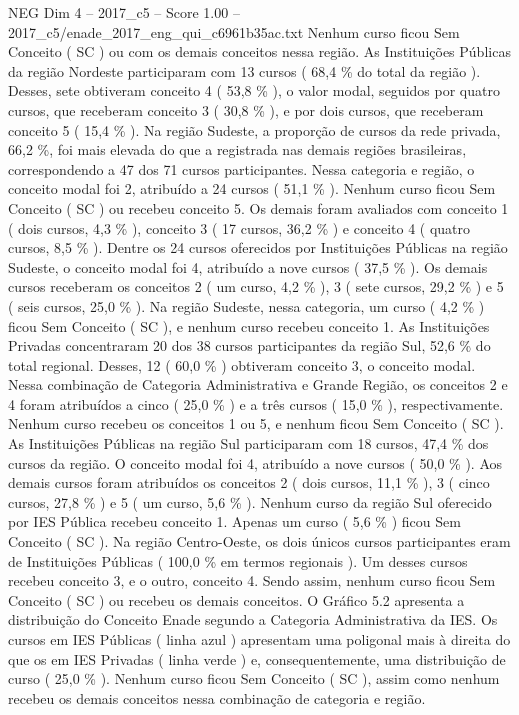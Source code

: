 \begin{textsample}{NEG Dim 4 – 2017\_c5 – Score 1.00 – 2017\_c5/enade\_2017\_eng\_qui\_c6961b35ac.txt}
Nenhum curso ficou Sem Conceito ( SC ) ou com os demais conceitos nessa região.
As Instituições Públicas da região Nordeste participaram com 13 cursos ( 68,4 \% do total da região ).
Desses, sete obtiveram conceito 4 ( 53,8 \% ), o valor modal, seguidos por quatro cursos, que receberam conceito 3 ( 30,8 \% ), e por dois cursos, que receberam conceito 5 ( 15,4 \% ).
Na região Sudeste, a proporção de cursos da rede privada, 66,2 \%, foi mais elevada do que a registrada nas demais regiões brasileiras, correspondendo a 47 dos 71 cursos participantes.
Nessa categoria e região, o conceito modal foi 2, atribuído a 24 cursos ( 51,1 \% ).
Nenhum curso ficou Sem Conceito ( SC ) ou recebeu conceito 5.
Os demais foram avaliados com conceito 1 ( dois cursos, 4,3 \% ), conceito 3 ( 17 cursos, 36,2 \% ) e conceito 4 ( quatro cursos, 8,5 \% ).
Dentre os 24 cursos oferecidos por Instituições Públicas na região Sudeste, o conceito modal foi 4, atribuído a nove cursos ( 37,5 \% ).
Os demais cursos receberam os conceitos 2 ( um curso, 4,2 \% ), 3 ( sete cursos, 29,2 \% ) e 5 ( seis cursos, 25,0 \% ).
Na região Sudeste, nessa categoria, um curso ( 4,2 \% ) ficou Sem Conceito ( SC ), e nenhum curso recebeu conceito 1.
As Instituições Privadas concentraram 20 dos 38 cursos participantes da região Sul, 52,6 \% do total regional.
Desses, 12 ( 60,0 \% ) obtiveram conceito 3, o conceito modal.
Nessa combinação de Categoria Administrativa e Grande Região, os conceitos 2 e 4 foram atribuídos a cinco ( 25,0 \% ) e a três cursos ( 15,0 \% ), respectivamente.
Nenhum curso recebeu os conceitos 1 ou 5, e nenhum ficou Sem Conceito ( SC ).
As Instituições Públicas na região Sul participaram com 18 cursos, 47,4 \% dos cursos da região.
O conceito modal foi 4, atribuído a nove cursos ( 50,0 \% ).
Aos demais cursos foram atribuídos os conceitos 2 ( dois cursos, 11,1 \% ), 3 ( cinco cursos, 27,8 \% ) e 5 ( um curso, 5,6 \% ).
Nenhum curso da região Sul oferecido por IES Pública recebeu conceito 1.
Apenas um curso ( 5,6 \% ) ficou Sem Conceito ( SC ).
Na região Centro-Oeste, os dois únicos cursos participantes eram de Instituições Públicas ( 100,0 \% em termos regionais ).
Um desses cursos recebeu conceito 3, e o outro, conceito 4.
Sendo assim, nenhum curso ficou Sem Conceito ( SC ) ou recebeu os demais conceitos.
O Gráfico 5.2 apresenta a distribuição do Conceito Enade segundo a Categoria Administrativa da IES.
Os cursos em IES Públicas ( linha azul ) apresentam uma poligonal mais à direita do que os em IES Privadas ( linha verde ) e, consequentemente, uma distribuição de curso ( 25,0 \% ).
Nenhum curso ficou Sem Conceito ( SC ), assim como nenhum recebeu os demais conceitos nessa combinação de categoria e região.

\end{textsample}
